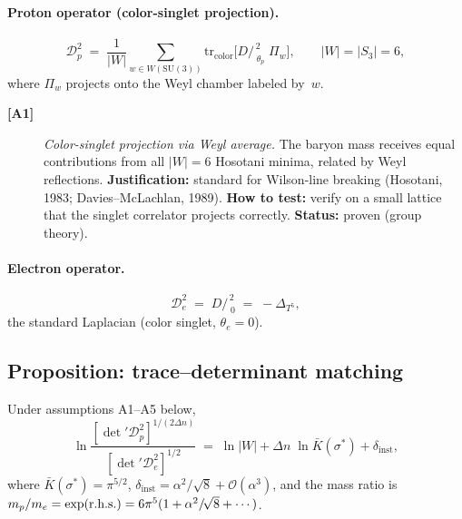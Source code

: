 \paragraph{Proton operator (color-singlet projection).}
\begin{equation}\label{eq:Z16_Dp}
  \mathcal{D}_p^2
  \;=\; \frac{1}{|W|}\sum_{w\in W(\mathrm{SU}(3))}
    \mathrm{tr}_{\mathrm{color}}
    \bigl[D\!\!\!\!/_{\;\theta_p}^{\,2}\;\Pi_w\bigr],
  \qquad |W|=|S_3|=6,
\end{equation}
where $\Pi_w$ projects onto the Weyl chamber labeled by~$w$.

\begin{description}
\item[\textbf{[A1]}] \emph{Color-singlet projection via Weyl
  average.}  The baryon mass receives equal contributions from all
  $|W|=6$ Hosotani minima, related by Weyl reflections.
  \textbf{Justification:} standard for Wilson-line breaking
  (Hosotani, 1983; Davies--McLachlan, 1989).
  \textbf{How to test:} verify on a small lattice that the singlet
  correlator projects correctly.
  \textbf{Status:} proven (group theory).
\end{description}

\paragraph{Electron operator.}
\begin{equation}\label{eq:Z16_De}
  \mathcal{D}_e^2
  \;=\; D\!\!\!\!/_{\;0}^{\,2}
  \;=\; -\Delta_{T^5},
\end{equation}
the standard Laplacian (color singlet, $\theta_e=0$).

\subsection{Proposition: trace--determinant matching}
\label{sec:Z16_proposition}

\begin{proposition}\label{prop:detratio}
Under assumptions \textup{A1--A5} below,
\begin{equation}\label{eq:Z16_logdet}
  \ln\frac{[\det'\mathcal{D}_p^2]^{1/(2\Delta n)}}
          {[\det'\mathcal{D}_e^2]^{1/2}}
  \;=\; \ln|W| + \Delta n\;\ln\bar K(\sigma^*)
    + \delta_{\mathrm{inst}},
\end{equation}
where $\bar K(\sigma^*)=\pi^{5/2}$\textup,
$\delta_{\mathrm{inst}}=\alpha^2/\!\sqrt{8}+\mathcal{O}(\alpha^3)$\textup,
and the mass ratio is
$m_p/m_e = \exp(\textup{r.h.s.})
= 6\pi^5(1+\alpha^2/\!\sqrt{8}+\cdots)$.
\end{proposition}

